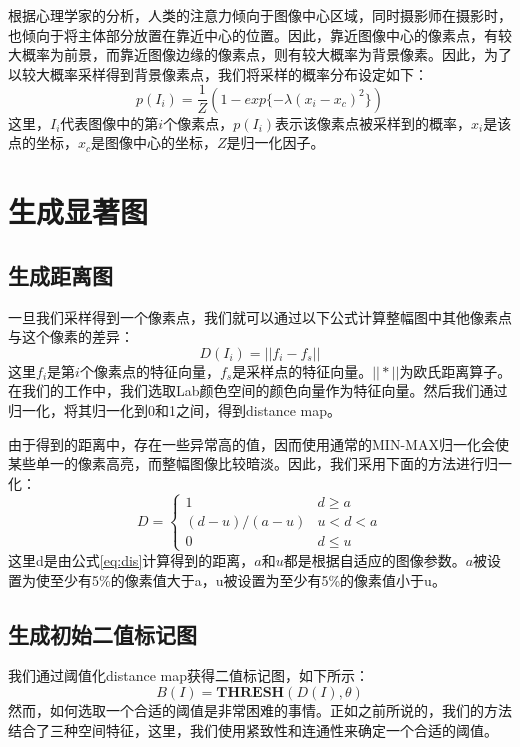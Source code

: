 根据心理学家的分析\cite{tatler2007central}，人类的注意力倾向于图像中心区域，同时摄影师在摄影时，也倾向于将主体部分放置在靠近中心的位置。因此，靠近图像中心的像素点，有较大概率为前景，而靠近图像边缘的像素点，则有较大概率为背景像素。因此，为了以较大概率采样得到背景像素点，我们将采样的概率分布设定如下：
\begin{equation}
p(I_i) = \frac{1}{Z}(1-exp\{-\lambda(x_i-x_c)^2\})
\end{equation}
这里，$I_i$代表图像中的第$i$个像素点，$p(I_i)$表示该像素点被采样到的概率，$x_i$是该点的坐标，$x_c$是图像中心的坐标，$Z$是归一化因子。

\section{生成显著图}
\subsection{生成距离图}
一旦我们采样得到一个像素点，我们就可以通过以下公式计算整幅图中其他像素点与这个像素的差异：
\begin{equation}
D(I_i) = ||f_i - f_s|| \label{eq:dis}
\end{equation}
这里$f_i$是第$i$个像素点的特征向量，$f_s$是采样点的特征向量。$||*||$为欧氏距离算子。在我们的工作中，我们选取Lab颜色空间的颜色向量作为特征向量。然后我们通过归一化，将其归一化到0和1之间，得到distance map。

由于得到的距离中，存在一些异常高的值，因而使用通常的MIN-MAX归一化会使某些单一的像素高亮，而整幅图像比较暗淡。因此，我们采用下面的方法进行归一化：
\begin{equation}
D = 
\begin{cases}
1& d \geq a\\
(d-u)/(a-u) & u<d<a\\
0& d \leq u
\end{cases}
\end{equation}
这里d是由公式\ref{eq:dis}计算得到的距离，$a$和$u$都是根据自适应的图像参数。$a$被设置为使至少有5\%的像素值大于a，u被设置为至少有5\%的像素值小于u。

\subsection{生成初始二值标记图}
我们通过阈值化distance map获得二值标记图，如下所示：
\begin{equation}
B(I)= \textbf{THRESH}(D(I), \theta)
\end{equation}
然而，如何选取一个合适的阈值是非常困难的事情。正如之前所说的，我们的方法结合了三种空间特征，这里，我们使用紧致性和连通性来确定一个合适的阈值。

